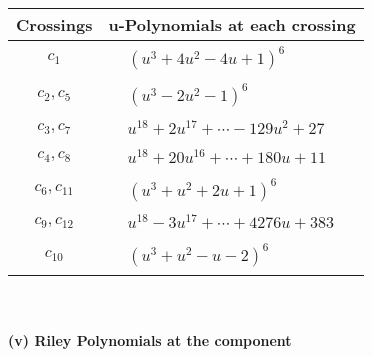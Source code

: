 \documentclass[1p]{elsarticle_modified}
\theoremstyle{definition}
\begin{document}
\begin{tabular}{m{50pt}|m{274pt}}
Crossings & \hspace{64pt}u-Polynomials at each crossing \\
\hline $$\begin{aligned}c_{1}\end{aligned}$$&$\begin{aligned}
&(u^3+4 u^2-4 u+1)^6
\end{aligned}$\\
\hline $$\begin{aligned}c_{2},c_{5}\end{aligned}$$&$\begin{aligned}
&(u^3-2 u^2-1)^6
\end{aligned}$\\
\hline $$\begin{aligned}c_{3},c_{7}\end{aligned}$$&$\begin{aligned}
&u^{18}+2 u^{17}+\cdots-129 u^2+27
\end{aligned}$\\
\hline $$\begin{aligned}c_{4},c_{8}\end{aligned}$$&$\begin{aligned}
&u^{18}+20 u^{16}+\cdots+180 u+11
\end{aligned}$\\
\hline $$\begin{aligned}c_{6},c_{11}\end{aligned}$$&$\begin{aligned}
&(u^3+u^2+2 u+1)^6
\end{aligned}$\\
\hline $$\begin{aligned}c_{9},c_{12}\end{aligned}$$&$\begin{aligned}
&u^{18}-3 u^{17}+\cdots+4276 u+383
\end{aligned}$\\
\hline $$\begin{aligned}c_{10}\end{aligned}$$&$\begin{aligned}
&(u^3+u^2- u-2)^6
\end{aligned}$\\
\hline
\end{tabular}\\~\\
\newpage\renewcommand{\arraystretch}{1}
\flushleft \textbf{(v) Riley Polynomials at the component}\newline \\
\end{document}
